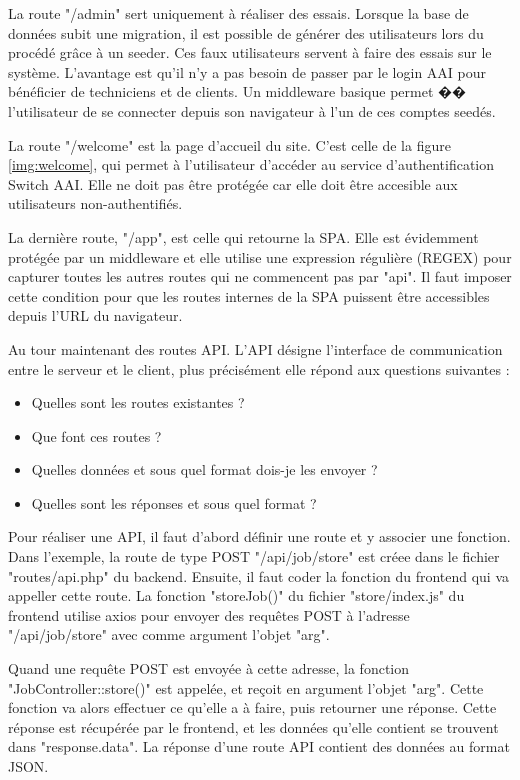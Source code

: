 \documentclass[
    iai, %
    eai, %
]{heig-tb}
\begin{document}
La route "/admin" sert uniquement à réaliser des essais. Lorsque la base de données subit une migration, il est possible de générer des utilisateurs lors du procédé grâce à un seeder. Ces faux utilisateurs servent à faire des essais sur le système. L'avantage est qu'il n'y a pas besoin de passer par le login AAI pour bénéficier de techniciens et de clients. Un middleware basique permet �� l'utilisateur de se connecter depuis son navigateur à l'un de ces comptes seedés.

La route "/welcome" est la page d'accueil du site. C'est celle de la figure \ref{img:welcome}, qui permet à l'utilisateur d'accéder au service d'authentification Switch AAI. Elle ne doit pas être protégée car elle doit être accesible aux utilisateurs non-authentifiés.

La dernière route, "/app", est celle qui retourne la SPA. Elle est évidemment protégée par un middleware et elle utilise une expression régulière (REGEX) pour capturer toutes les autres routes qui ne commencent pas par "api". Il faut imposer cette condition pour que les routes internes de la SPA puissent être accessibles depuis l'URL du navigateur.

\newpage
Au tour maintenant des routes API. L'API désigne l'interface de communication entre le serveur et le client, plus précisément elle répond aux questions suivantes :
\begin{itemize}
  \item Quelles sont les routes existantes ?
  \item Que font ces routes ?
  \item Quelles données et sous quel format dois-je les envoyer ?
  \item Quelles sont les réponses et sous quel format ?
\end{itemize}
\bigskip

Pour réaliser une API, il faut d'abord définir une route et y associer une fonction. Dans l'exemple, la route de type POST "/api/job/store" est créee dans le fichier "routes/api.php" du backend.
Ensuite, il faut coder la fonction du frontend qui va appeller cette route. La fonction "storeJob()" du fichier "store/index.js" du frontend utilise axios pour envoyer des requêtes POST à l'adresse "/api/job/store" avec comme argument l'objet "arg".

Quand une requête POST est envoyée à cette adresse, la fonction "JobController::store()" est appelée, et reçoit en argument l'objet "arg". Cette fonction va alors effectuer ce qu'elle a à faire, puis retourner une réponse. Cette réponse est récupérée par le frontend, et les données qu'elle contient se trouvent dans "response.data". La réponse d'une route API contient des données au format JSON.
\end{document}
